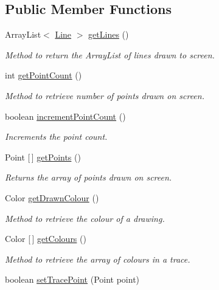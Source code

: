 \subsection*{Public Member Functions}
\begin{DoxyCompactItemize}
\item 
Array\+List$<$ \hyperlink{class_line}{Line} $>$ \hyperlink{class_drawing_panel_a3f8dc5d1f652dd58859ca98dce3e325b}{get\+Lines} ()
\begin{DoxyCompactList}\small\item\em Method to return the Array\+List of lines drawn to screen. \end{DoxyCompactList}\item 
int \hyperlink{class_drawing_panel_a77c3fd72e4c60f65d043ff01e7a8802d}{get\+Point\+Count} ()
\begin{DoxyCompactList}\small\item\em Method to retrieve number of points drawn on screen. \end{DoxyCompactList}\item 
boolean \hyperlink{class_drawing_panel_a4b121aedcf7c0c4a333519db1e340a9b}{increment\+Point\+Count} ()
\begin{DoxyCompactList}\small\item\em Increments the point count. \end{DoxyCompactList}\item 
Point \mbox{[}$\,$\mbox{]} \hyperlink{class_drawing_panel_a7622f1394438b6ec633ac2cde884bb99}{get\+Points} ()
\begin{DoxyCompactList}\small\item\em Returns the array of points drawn on screen. \end{DoxyCompactList}\item 
Color \hyperlink{class_drawing_panel_ae0c2b7deb6ba8eae624e58c850a3a559}{get\+Drawn\+Colour} ()
\begin{DoxyCompactList}\small\item\em Method to retrieve the colour of a drawing. \end{DoxyCompactList}\item 
Color \mbox{[}$\,$\mbox{]} \hyperlink{class_drawing_panel_a90f962e27cca561096b4d5a68fd69ac3}{get\+Colours} ()
\begin{DoxyCompactList}\small\item\em Method to retrieve the array of colours in a trace. \end{DoxyCompactList}\item 
boolean \hyperlink{class_drawing_panel_a7eae2c9bc64af0b4bcb177370598b3ad}{set\+Trace\+Point} (Point point)

\end{DoxyCompactItemize}
